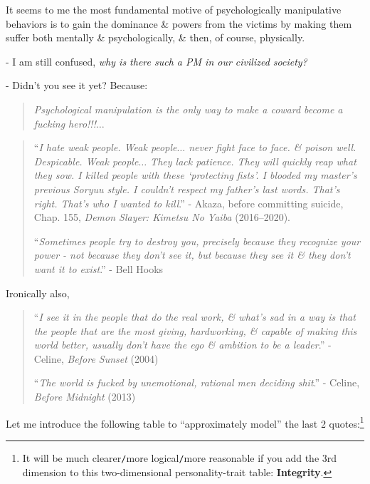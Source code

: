 \documentclass[12pt]{article}
\begin{document}
It seems to me the most fundamental motive of psychologically manipulative behaviors is to gain the dominance \& powers from the victims by making them suffer both mentally \& psychologically, \& then, of course, physically. 

- I am still confused, {\it why is there such a PM in our civilized society?}

- Didn't you see it yet? Because:
\begin{quotation}
	{\it Psychological manipulation is the only way to make a coward become a fucking hero!!!}$\ldots$
\end{quotation}

\begin{quotation}
	``{\it I hate weak people. Weak people$\ldots$ never fight face to face. \& poison well. Despicable. Weak people$\ldots$ They lack patience. They will quickly reap what they sow. I killed people with these `protecting fists'. I blooded my master's previous Soryuu style. I couldn't respect my father's last words. That's right. That's who I wanted to kill}.'' - Akaza, before committing suicide, Chap. 155, {\it Demon Slayer: Kimetsu No Yaiba} (2016--2020).
	
	``{\it Sometimes people try to destroy you, precisely because they recognize your power - not because they don't see it, but because they see it \& they don't want it to exist}.'' - Bell Hooks
\end{quotation}
Ironically also,

\begin{quotation}
	``{\it I see it in the people that do the real work, \& what's sad in a way is that the people that are the most giving, hardworking, \& capable of making this world better, usually don't have the ego \& ambition to be a leader}.'' - Celine, {\it Before Sunset} (2004)
	
	``{\it The world is fucked by unemotional, rational men deciding shit}.'' - Celine, {\it Before Midnight} (2013)
\end{quotation}
Let me introduce the following table to ``approximately model'' the last 2 quotes:\footnote{It will be much clearer{\tt/}more logical{\tt/}more reasonable if you add the 3rd dimension to this two-dimensional personality-trait table: \textbf{Integrity}.}
\end{document}

